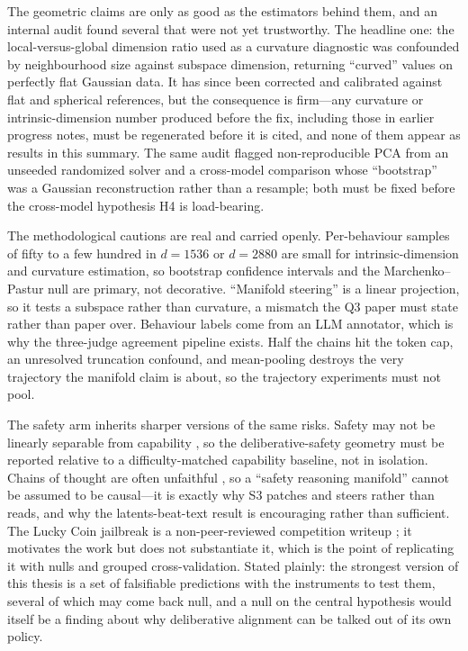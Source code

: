 \documentclass[10pt]{article}
\begin{document}
The geometric claims are only as good as the estimators behind them, and an internal
audit found several that were not yet trustworthy. The headline one: the
local-versus-global dimension ratio used as a curvature diagnostic was confounded by
neighbourhood size against subspace dimension, returning ``curved'' values on
perfectly flat Gaussian data. It has since been corrected and calibrated against flat
and spherical references, but the consequence is firm---any curvature or
intrinsic-dimension number produced before the fix, including those in earlier
progress notes, must be regenerated before it is cited, and none of them appear as
results in this summary. The same audit flagged non-reproducible PCA from an
unseeded randomized solver and a cross-model comparison whose ``bootstrap'' was a
Gaussian reconstruction rather than a resample; both must be fixed before the
cross-model hypothesis H4 is load-bearing.

The methodological cautions are real and carried openly. Per-behaviour samples of
fifty to a few hundred in $d=1536$ or $d=2880$ are small for intrinsic-dimension and
curvature estimation, so bootstrap confidence intervals and the
Marchenko--Pastur null are primary, not decorative. ``Manifold steering'' is a linear
projection, so it tests a subspace rather than curvature, a mismatch the Q3 paper must
state rather than paper over. Behaviour labels come from an LLM annotator, which is why
the three-judge agreement pipeline exists. Half the chains hit the token cap, an
unresolved truncation confound, and mean-pooling destroys the very trajectory the
manifold claim is about, so the trajectory experiments must not pool.

The safety arm inherits sharper versions of the same risks. Safety may not be linearly
separable from capability \citep{ponkshe2025safety}, so the deliberative-safety
geometry must be reported relative to a difficulty-matched capability baseline, not in
isolation. Chains of thought are often unfaithful \citep{chen2025dontsay}, so a
``safety reasoning manifold'' cannot be assumed to be causal---it is exactly why S3
patches and steers rather than reads, and why the latents-beat-text result
\citep{chan2025predict} is encouraging rather than sufficient. The Lucky Coin jailbreak
is a non-peer-reviewed competition writeup \citep{ye2025luckycoin}; it motivates the
work but does not substantiate it, which is the point of replicating it with nulls and
grouped cross-validation. Stated plainly: the strongest version of this thesis is a set
of falsifiable predictions with the instruments to test them, several of which may come
back null, and a null on the central hypothesis would itself be a finding about why
deliberative alignment can be talked out of its own policy.
\end{document}
